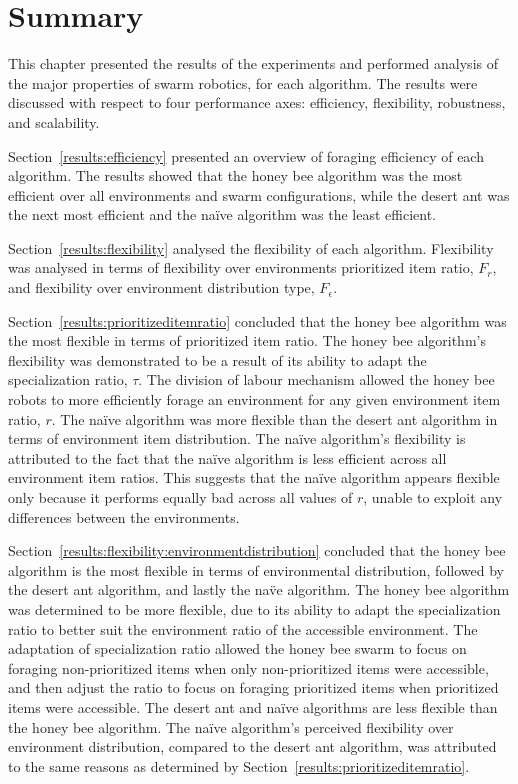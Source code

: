 \section{Summary}
\label{results:summary}

This chapter presented the results of the experiments and performed analysis of the major properties of swarm robotics, for each algorithm. The results were discussed with respect to four performance axes: efficiency, flexibility, robustness, and scalability. 

Section~\ref{results:efficiency} presented an overview of foraging efficiency of each algorithm. The results showed that the honey bee algorithm was the most efficient over all environments and swarm configurations, while the desert ant was the next most efficient and the na\"ive algorithm was the least efficient.

Section~\ref{results:flexibility} analysed the flexibility of each algorithm. Flexibility was analysed in terms of flexibility over environments prioritized item ratio, $F_r$, and flexibility over environment distribution type, $F_\epsilon$. 

Section~\ref{results:prioritizeditemratio} concluded that the honey bee algorithm was the most flexible in terms of prioritized item ratio. The honey bee algorithm's flexibility was demonstrated to be a result of its ability to adapt the specialization ratio, $\tau$. The division of labour mechanism allowed the honey bee robots to more efficiently forage an environment for any given environment item ratio, $r$. The na\"ive algorithm was more flexible than the desert ant algorithm in terms of environment item distribution. The na\"ive algorithm's flexibility is attributed to the fact that the na\"ive algorithm is less efficient across all environment item ratios. This suggests that the na\"ive algorithm appears flexible only because it performs equally bad across all values of $r$, unable to exploit any differences between the environments. 

Section~\ref{results:flexibility:environmentdistribution} concluded that the honey bee algorithm is the most flexible in terms of environmental distribution, followed by the desert ant algorithm, and lastly the na\"ve algorithm. The honey bee algorithm was determined to be more flexible, due to its ability to adapt the specialization ratio to better suit the environment ratio of the accessible environment. The adaptation of specialization ratio allowed the honey bee swarm to focus on foraging non-prioritized items when only non-prioritized items were accessible, and then adjust the ratio to focus on foraging prioritized items when prioritized items were accessible. The desert ant and na\"ive algorithms are less flexible than the honey bee algorithm. The na\"ive algorithm's perceived flexibility over environment distribution, compared to the desert ant algorithm, was attributed to the same reasons as determined by Section~\ref{results:prioritizeditemratio}. 
  
